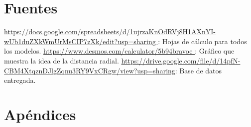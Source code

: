 \documentclass[a4paper]{article}
\begin{document}
\section{Fuentes}
\url{https://docs.google.com/spreadsheets/d/1ujrzaKnOdRVj8H1AXnYI-wUb1duZXkWmUrMsCIP7zXk/edit?usp=sharing }: Hojas de cálculo para todos los modelos.\newline\newline
\url{ https://www.desmos.com/calculator/5b94bravoe }: Gráfico que muestra la idea de la distancia radial. \newline\newline 
\url{https://drive.google.com/file/d/14pfN-CBM4XtqznDJlgZqnu3RY9VxCRgw/view?usp=sharing}: Base de datos entregada.

\section{Apéndices}
\end{document}
